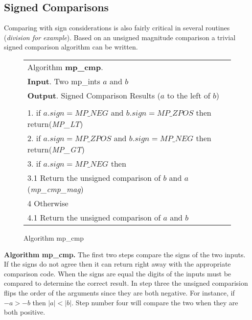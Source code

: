 \documentclass[b5paper]{book}
\begin{document}
\subsection{Signed Comparisons}
Comparing with sign considerations is also fairly critical in several routines (\textit{division for example}).  Based on an unsigned magnitude 
comparison a trivial signed comparison algorithm can be written.

\begin{figure}[here]
\begin{center}
\begin{tabular}{l}
\hline Algorithm \textbf{mp\_cmp}. \\
\textbf{Input}.   Two mp\_ints $a$ and $b$ \\
\textbf{Output}.  Signed Comparison Results ($a$ to the left of $b$) \\
\hline \\
1.  if $a.sign = MP\_NEG$ and $b.sign = MP\_ZPOS$ then return(\textit{MP\_LT}) \\
2.  if $a.sign = MP\_ZPOS$ and $b.sign = MP\_NEG$ then return(\textit{MP\_GT}) \\
3.  if $a.sign = MP\_NEG$ then \\
\hspace{+3mm}3.1  Return the unsigned comparison of $b$ and $a$ (\textit{mp\_cmp\_mag}) \\
4   Otherwise \\
\hspace{+3mm}4.1  Return the unsigned comparison of $a$ and $b$ \\
\hline
\end{tabular}
\end{center}
\caption{Algorithm mp\_cmp}
\end{figure}

\textbf{Algorithm mp\_cmp.}
The first two steps compare the signs of the two inputs.  If the signs do not agree then it can return right away with the appropriate 
comparison code.  When the signs are equal the digits of the inputs must be compared to determine the correct result.  In step 
three the unsigned comparision flips the order of the arguments since they are both negative.  For instance, if $-a > -b$ then 
$\vert a \vert < \vert b \vert$.  Step number four will compare the two when they are both positive.
\end{document}
